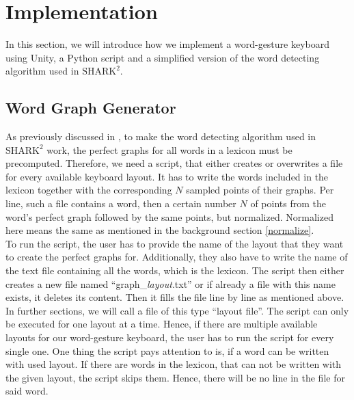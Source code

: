\chapter{Implementation}

In this section, we will introduce how we implement a word-gesture keyboard using Unity, a Python script and a simplified version of the word detecting algorithm used in $\text{SHARK}^2$.

\section{Word Graph Generator}
As previously discussed in , to make the word detecting algorithm used in $\text{SHARK}^2$ work, the perfect graphs for all words in a lexicon must be precomputed. Therefore, we need a script, that either creates or overwrites a file for every available keyboard layout. It has to write the words included in the lexicon together with the corresponding $N$ sampled points of their graphs. Per line, such a file contains a word, then a certain number $N$ of points from the word's perfect graph followed by the same points, but normalized. Normalized here means the same as mentioned in the background section \ref{normalize}.\\
To run the script, the user has to provide the name of the layout that they want to create the perfect graphs for. Additionally, they also have to write the name of the text file containing all the words, which is the lexicon. The script then either creates a new file named ``graph\_\textit{layout}.txt'' or if already a file with this name exists, it deletes its content. Then it fills the file line by line as mentioned above. In further sections, we will call a file of this type ``layout file''. The script can only be executed for one layout at a time. Hence, if there are multiple available layouts for our word-gesture keyboard, the user has to run the script for every single one. One thing the script pays attention to is, if a word can be written with used layout. If there are words in the lexicon, that can not be written with the given layout, the script skips them. Hence, there will be no line in the file for said word. 

